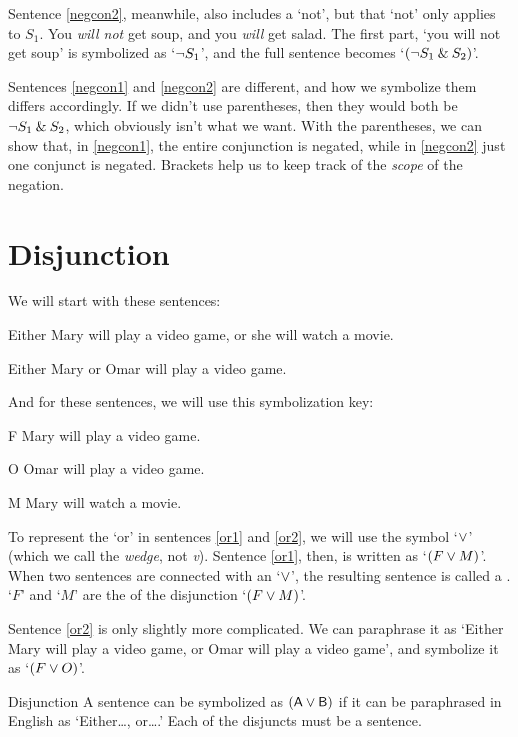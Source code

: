 Sentence \ref{negcon2}, meanwhile, also includes a `not', but that `not' only applies to $S_1$. You \emph{will not} get soup, and you \emph{will} get salad. The first part, `you will not get soup' is symbolized as `${\neg} S_1$', and the full sentence becomes `$({\neg} S_1 \mathbin{\&} S_2)$'. 

Sentences \ref{negcon1} and \ref{negcon2} are different, and how we symbolize them differs accordingly. If we didn't use parentheses, then they would both be ${\neg} S_1 \mathbin{\&} S_2$, which obviously isn't what we want. With the parentheses, we can show that, in \ref{negcon1}, the entire conjunction is negated, while in \ref{negcon2} just one conjunct is negated. Brackets help us to keep track of the \emph{scope} of the negation. 

\section{Disjunction}
\label{s:ConnectiveDisjunction}

We will start with these sentences:
	\begin{earg}
		\item[\ex{or1}]Either Mary will play a video game, or she will watch a movie.
		\item[\ex{or2}]Either Mary or Omar will play a video game. 
	\end{earg}
And for these sentences, we will use this symbolization key:
	\begin{ekey}
		\item[F] Mary will play a video game.
		\item[O] Omar will play a video game.
		\item[M] Mary will watch a movie.
	\end{ekey}
To represent the `or' in sentences \ref{or1} and \ref{or2}, we will use the symbol `$\vee$' (which we call the \textit{wedge}, not \textit{v}). Sentence \ref{or1}, then, is written as `$(F \vee M)$'. When two sentences are connected with an `$\vee$', the resulting sentence is called a . `$F$' and `$M$' are the  of the disjunction `$(F \vee M)$'.

Sentence \ref{or2} is only slightly more complicated. We can paraphrase it as `Either Mary will play a video game, or Omar will play a video game', and symbolize it as `$(F \vee O)$'.

\begin{factboxy}{Disjunction}
		A sentence can be symbolized as $(\mathsf{A}\vee\mathsf{B})$ if it can be paraphrased in English as `Either\ldots, or\ldots.' Each of the disjuncts must be a sentence.
\end{factboxy}


